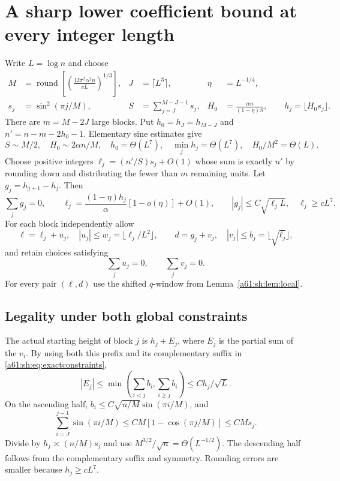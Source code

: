 \documentclass[11pt,letterpaper]{article}
\numberwithin{equation}{section}
\theoremstyle{remark}\newtheorem{remark}[theorem]{Remark}
\begin{document}
\section{A sharp lower coefficient bound at every integer length}
Write $L=\log n$ and choose
\begin{align*}
 M&=\operatorname{round}\!\left[\left(\frac{12\pi^2\alpha^2n}{vL}\right)^{1/3}\right],&
 J&=\lceil L^3\rceil,&\eta&=L^{-1/4},\\
 s_j&=\sin^2(\pi j/M),&
 S&=\sum_{j=J}^{M-J-1}s_j,&
 H_0&=\frac{\alpha n}{(1-\eta)S},\qquad h_j=\lfloor H_0s_j\rfloor.
\end{align*}
There are $m=M-2J$ large blocks. Put $h_0=h_J=h_{M-J}$ and $n'=n-m-2h_0-1$. Elementary sine estimates give
\[
 S\sim M/2,\quad H_0\sim2\alpha n/M,\quad
 h_0=\Theta(L^7),\quad \min_jh_j=\Theta(L^7),\quad H_0/M^2=\Theta(L).
\]
Choose positive integers $\ell_j=(n'/S)s_j+O(1)$ whose sum is exactly $n'$ by rounding down and distributing the fewer than $m$ remaining units. Let $g_j=h_{j+1}-h_j$. Then
\begin{equation}\label{a61:sh:eq:centers}
 \sum_jg_j=0,\qquad
 \ell_j=\frac{(1-\eta)h_j}{\alpha}[1-o(\eta)]+O(1),\qquad
 |g_j|\le C\sqrt{\ell_jL},\quad\ell_j\ge cL^7.
\end{equation}
For each block independently allow
\[
 \ell=\ell_j+u_j,\quad |u_j|\le w_j=\lfloor\ell_j/L^2\rfloor,
 \qquad d=g_j+v_j,\quad |v_j|\le b_j=\lfloor\sqrt{\ell_j}\rfloor,
\]
and retain choices satisfying
\begin{equation}\label{a61:sh:eq:exactconstraints}
 \sum_ju_j=0,\qquad\sum_jv_j=0.
\end{equation}
For every pair $(\ell,d)$ use the shifted $q$-window from Lemma~\ref{a61:sh:lem:local}.

\subsection{Legality under both global constraints}
The actual starting height of block $j$ is $h_j+E_j$, where $E_j$ is the partial sum of the $v_i$. By using both this prefix and its complementary suffix in \eqref{a61:sh:eq:exactconstraints},
\begin{equation}\label{a61:sh:eq:errorheight}
 |E_j|\le\min\left(\sum_{i<j}b_i,\sum_{i\ge j}b_i\right)
 \le C h_j/\sqrt L.
\end{equation}
On the ascending half, $b_i\le C\sqrt{n/M}\sin(\pi i/M)$, and
\[
 \sum_{i=J}^{j-1}\sin(\pi i/M)
 \le CM[1-\cos(\pi j/M)]\le CM s_j.
\]
Divide by $h_j\asymp(n/M)s_j$ and use $M^{3/2}/\sqrt n=\Theta(L^{-1/2})$. The descending half follows from the complementary suffix and symmetry. Rounding errors are smaller because $h_j\ge cL^7$.
\end{document}

